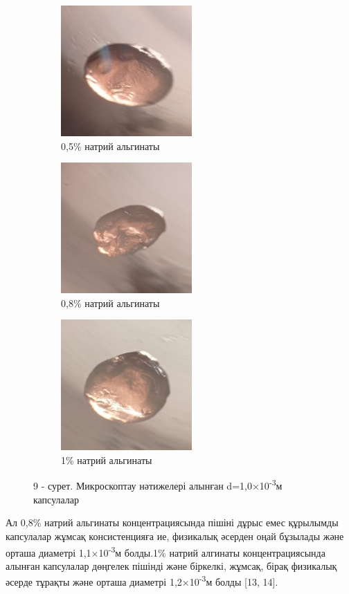 \begin{figure}[H]
	\centering
	\begin{subfigure}[b]{0.3\textwidth}
		\centering
		\includegraphics[width=5cm,height=5cm]{media/pish/image38}
		\caption*{0,5\% натрий альгинаты}
	\end{subfigure}
	\hfill
	\begin{subfigure}[b]{0.3\textwidth}
		\centering
		\includegraphics[width=5cm,height=5cm]{media/pish/image39}
		\caption*{0,8\% натрий альгинаты}
	\end{subfigure}
	\hfill
	\begin{subfigure}[b]{0.3\textwidth}
		\centering
		\includegraphics[width=5cm,height=5cm]{media/pish/image40}
		\caption*{1\% натрий альгинаты}
	\end{subfigure}
	\caption*{9 - сурет. Микроскоптау нәтижелері алынған d=1,0×10\textsuperscript{-3}м капсулалар}
\end{figure}

Ал 0,8\% натрий альгинаты концентрациясында пішіні дұрыс емес құрылымды
капсулалар жұмсақ консистенцияға ие, физикалық әсерден оңай бұзылады
және орташа диаметрі 1,1×10\textsuperscript{-3}м болды.1\% натрий
алгинаты концентрациясында алынған капсулалар дөңгелек пішінді және
біркелкі, жұмсақ, бірақ физикалық әсерде тұрақты және орташа диаметрі
1,2×10\textsuperscript{-3}м болды {[}13, 14{]}.

